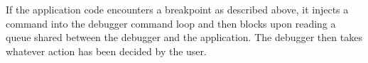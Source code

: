 If the application code encounters a breakpoint as described above, it
injects a command into the debugger command loop and then blocks upon
reading a queue shared between the debugger and the application.  The
debugger then takes whatever action has been decided by the user.

